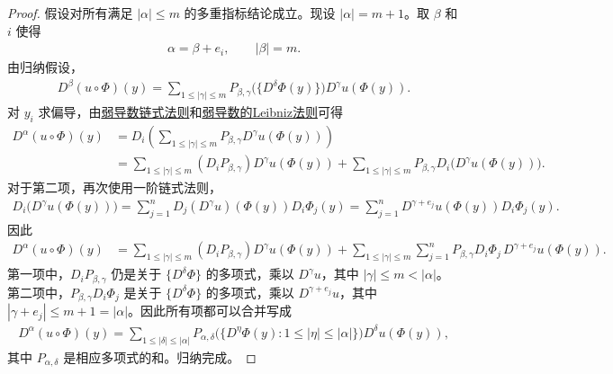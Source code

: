 \documentclass[../../main.tex]{subfiles}%
\begin{document}
\begin{proof}
假设对所有满足 $|\alpha|\leqslant m$ 的多重指标结论成立。现设 $|\alpha|=m+1$。取 $\beta$ 和 $i$ 使得
\begin{align*}
\alpha=\beta+e_i,\qquad |\beta|=m.
\end{align*}
由归纳假设，
\begin{align*}
D^\beta(u\circ\Phi)(y)=\sum\limits_{1\leqslant|\gamma|\leqslant m}P_{\beta,\gamma}\bigl(\{D^\delta\Phi(y)\}\bigr)D^\gamma u(\Phi(y)).
\end{align*}
对 $y_i$ 求偏导，由\hyperref[theorem:弱导数链式法则]{弱导数链式法则}和\hyperref[theorem:ch05-弱导数性质-4]{弱导数的Leibniz法则}可得
\begin{align*}
D^\alpha(u\circ\Phi)(y)
&=D_i\left(\sum\limits_{1\leqslant|\gamma|\leqslant m}P_{\beta,\gamma}D^\gamma u(\Phi(y))\right)\\
&=\sum\limits_{1\leqslant|\gamma|\leqslant m}\left(D_i P_{\beta,\gamma}\right)D^\gamma u(\Phi(y))
+\sum\limits_{1\leqslant|\gamma|\leqslant m}P_{\beta,\gamma}D_i\bigl(D^\gamma u(\Phi(y))\bigr).
\end{align*}
对于第二项，再次使用一阶链式法则，
\begin{align*}
D_i\bigl(D^\gamma u(\Phi(y))\bigr)=\sum\limits_{j=1}^n D_j(D^\gamma u)(\Phi(y))D_i\Phi_j(y)
=\sum\limits_{j=1}^n D^{\gamma+e_j}u(\Phi(y))D_i\Phi_j(y).
\end{align*}
因此
\begin{align*}
D^\alpha(u\circ\Phi)(y)
&=\sum\limits_{1\leqslant|\gamma|\leqslant m}\left(D_i P_{\beta,\gamma}\right)D^\gamma u(\Phi(y))
+\sum\limits_{1\leqslant|\gamma|\leqslant m}\sum\limits_{j=1}^n P_{\beta,\gamma}D_i\Phi_j\,D^{\gamma+e_j}u(\Phi(y)).
\end{align*}
第一项中，$D_i P_{\beta,\gamma}$ 仍是关于 $\{D^\delta\Phi\}$ 的多项式，乘以 $D^\gamma u$，其中 $|\gamma|\leqslant m<|\alpha|$。第二项中，$P_{\beta,\gamma}D_i\Phi_j$ 是关于 $\{D^\delta\Phi\}$ 的多项式，乘以 $D^{\gamma+e_j}u$，其中 $|\gamma+e_j|\leqslant m+1=|\alpha|$。因此所有项都可以合并写成
\begin{align*}
D^\alpha(u\circ\Phi)(y)=\sum\limits_{1\leqslant|\delta|\leqslant|\alpha|}P_{\alpha,\delta}\bigl(\{D^\eta\Phi(y):1\leqslant|\eta|\leqslant|\alpha|\}\bigr)D^\delta u(\Phi(y)),
\end{align*}
其中 $P_{\alpha,\delta}$ 是相应多项式的和。归纳完成。
\end{proof}
\end{document}
